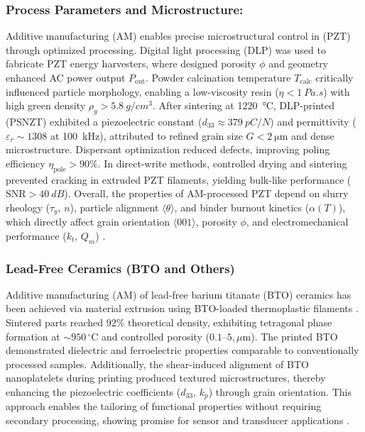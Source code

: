 \documentclass[a4paper,fleqn]{cas-sc}
\begin{document}
\subsubsection*{Process Parameters and Microstructure:}
\par Additive manufacturing (AM) enables precise microstructural control in  (PZT) through optimized processing. Digital light processing (DLP) was used to fabricate PZT energy harvesters, where designed porosity $\phi$ and geometry enhanced AC power output $P_{\text{out}}$. Powder calcination temperature $T_{\text{calc}}$ critically influenced particle morphology, enabling a low-viscosity resin ($\eta < \SI{1}{Pa.s}$) with high green density $\rho_g > \SI{5.8}{g/cm^3}$. After sintering at \SI{1220}{\degreeCelsius}, DLP-printed  (PSNZT) exhibited a piezoelectric constant ($d_{33} \approx \SI{379}{pC/N}$) and permittivity ($\varepsilon_r \sim 1308$ at \SI{100}{kHz}), attributed to refined grain size $G < \SI{2}{\micro\meter}$ and dense microstructure. Dispersant optimization reduced defects, improving poling efficiency $\eta_{\text{pole}} > 90\%$. In direct-write methods, controlled drying and sintering prevented cracking in extruded PZT filaments, yielding bulk-like performance ($\text{SNR} > \SI{40}{dB}$). Overall, the properties of AM-processed PZT depend on slurry rheology ($\tau_y$, $n$), particle alignment $\langle \theta \rangle$, and binder burnout kinetics ($\alpha(T)$), which directly affect grain orientation $\langle 001 \rangle$, porosity $\phi$, and electromechanical performance ($k_t$, $Q_m$) \cite{yu2025printability}.
\subsubsection*{Lead-Free Ceramics (BTO and Others)}
\par Additive manufacturing (AM) of lead-free barium titanate (BTO) ceramics has been achieved via material extrusion using BTO-loaded thermoplastic filaments \cite{bhandari2024material}. Sintered parts reached 92\% theoretical density, exhibiting tetragonal phase formation at \mbox{\ensuremath{\sim\!950\,^\circ\mathrm{C}}} and controlled porosity ($0.1\text{--}5,\mu$m). The printed BTO demonstrated dielectric and ferroelectric properties comparable to conventionally processed samples. Additionally, the shear-induced alignment of BTO nanoplatelets during printing produced textured microstructures, thereby enhancing the piezoelectric coefficients ($d_{33}$, $k_p$) through grain orientation. This approach enables the tailoring of functional properties without requiring secondary processing, showing promise for sensor and transducer applications \cite{bhandari2024material}.
\end{document}

